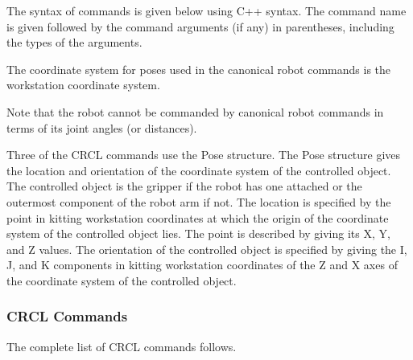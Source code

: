 The syntax of commands is given below using C++ syntax. The command
name is given followed by the command arguments (if any) in parentheses,
including the types of the arguments.

The coordinate system for poses used in the canonical robot commands is
the workstation coordinate system.

Note that the robot cannot be commanded by canonical robot commands in
terms of its joint angles (or distances).

Three of the CRCL commands use the Pose structure. The Pose structure gives
the location and orientation of the coordinate system of the controlled
object. The controlled object is the gripper if the robot has one attached
or the outermost component of the robot arm if not.  The location is
specified by the point in kitting workstation coordinates at which the
origin of the coordinate system of the controlled object lies. The point is
described by giving its X, Y, and Z values. The orientation of the
controlled object is specified by giving the I, J, and K components in
kitting workstation coordinates of the Z and X axes of the coordinate
system of the controlled object. \\

\subsubsection{CRCL Commands}

The complete list of CRCL commands follows.\\

